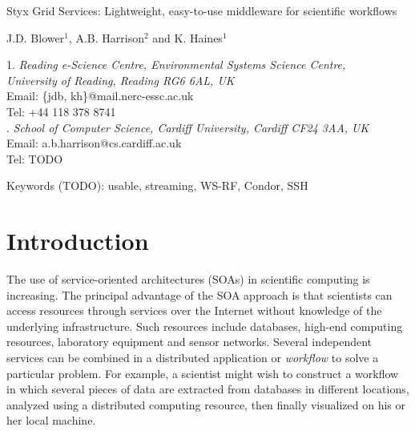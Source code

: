 \documentclass[a4paper]{article}
\begin{document}
\doublespacing

\begin{center}
{\Large Styx Grid Services: Lightweight, easy-to-use middleware for scientific workflows}

\bigskip
\bigskip

{\large J.D. Blower$^{1}$, A.B. Harrison$^{2}$ and K. Haines$^{1}$}

\bigskip

{\small 1. \textit{Reading e-Science Centre, Environmental Systems Science Centre, \\
University of Reading, Reading RG6 6AL, UK} \\
Email: \{jdb, kh\}@mail.nerc-essc.ac.uk\\
Tel: +44 118 378 8741 \\
. \textit{School of Computer Science, Cardiff University, Cardiff CF24 3AA, UK}\\
Email: a.b.harrison@cs.cardiff.ac.uk\\
Tel: TODO}

\bigskip
\bigskip

Keywords (TODO): usable, streaming, WS-RF, Condor, SSH

\end{center}

\newpage

\begin{abstract}
The service-oriented approach to performing distributed scientific research is potentially very powerful but is not yet widely used in many scientific fields.  This is partly due to the technical difficulties involved in creating services and composing them into workflows.  We present the Styx Grid Service, a simple system that wraps command-line programs and allows them to be run over the Internet exactly as if they were local programs.  Styx Grid Services are very easy to create and use and can be composed into powerful workflows with simple shell scripts or more sophisticated graphical tools.  Data can be streamed directly from service to service and progress can be monitored asynchronously using a mechanism that places very few demands on firewalls.  SOMETHING ABOUT CONDOR, GLOBUS ETC.  Styx Grid Services can interoperate with Web Services and WS-Resources.
\end{abstract}

\section{Introduction}\label{sec:intro}
The use of service-oriented architectures (SOAs) in scientific computing is increasing.  The principal advantage of the SOA approach is that scientists can access resources through services over the Internet without knowledge of the underlying infrastructure.  Such resources include databases, high-end computing resources, laboratory equipment and sensor networks.  Several independent services can be combined in a distributed application or \textit{workflow\/} to solve a particular problem.  For example, a scientist might wish to construct a workflow in which several pieces of data are extracted from databases in different locations, analyzed using a distributed computing resource, then finally visualized on his or her local machine.
\end{document}
